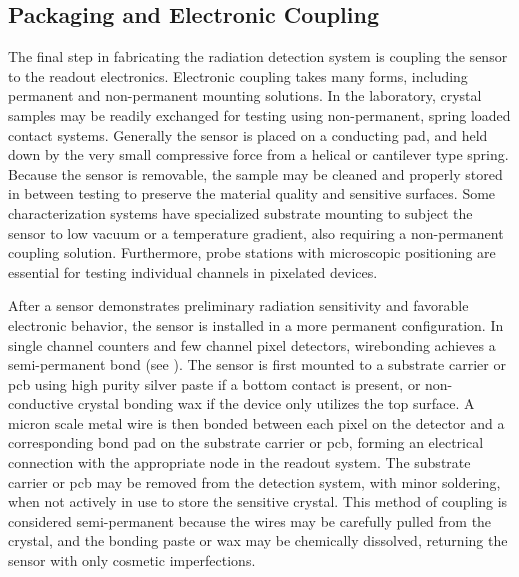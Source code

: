 \documentclass[../../../main.tex]{subfiles}%
\begin{document}
%
    \subsection{Packaging and Electronic Coupling}%
    \label{sec:chapter-3:sensor-fabrication:packaging}%
    The final step in fabricating the radiation detection system is coupling the sensor to the readout electronics.
    Electronic coupling takes many forms, including permanent and non-permanent mounting solutions.
    In the laboratory, crystal samples may be readily exchanged for testing using non-permanent, spring loaded contact systems.
    Generally the sensor is placed on a conducting pad, and held down by the very small compressive force from a helical or cantilever type spring.
    Because the sensor is removable, the sample may be cleaned and properly stored in between testing to preserve the material quality and sensitive surfaces.
    Some characterization systems have specialized substrate mounting to subject the sensor to low vacuum or a temperature gradient, also requiring a non-permanent coupling solution. 
    Furthermore, probe stations with microscopic positioning are essential for testing individual channels in pixelated devices.
    \par%
    After a sensor demonstrates preliminary radiation sensitivity and favorable electronic behavior, the sensor is installed in a more permanent configuration.
    In single channel counters and few channel pixel detectors, wirebonding achieves a semi-permanent bond (see ). 
    The sensor is first mounted to a substrate carrier or \gls{pcb} using high purity silver paste if a bottom contact is present, or non-conductive crystal bonding wax if the device only utilizes the top surface.
    A micron scale metal wire is then bonded between each pixel on the detector and a corresponding bond pad on the substrate carrier or \gls{pcb}, forming an electrical connection with the appropriate node in the readout system.
    The substrate carrier or \gls{pcb} may be removed from the detection system, with minor soldering, when not actively in use to store the sensitive crystal.
    This method of coupling is considered semi-permanent because the wires may be carefully pulled from the crystal, and the bonding paste or wax may be chemically dissolved, returning the sensor with only cosmetic imperfections.
\end{document}
